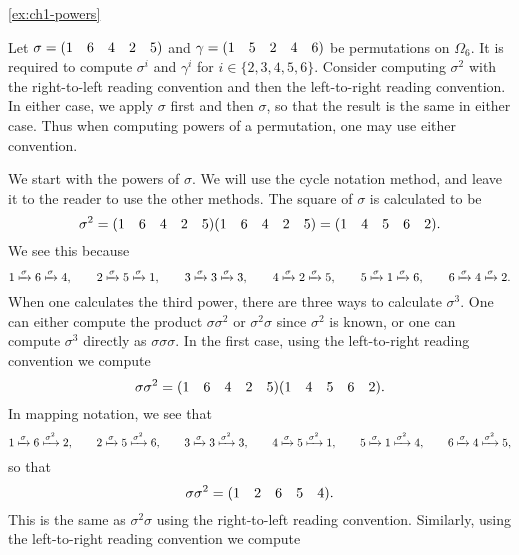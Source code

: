 \begin{solution}{\ref{ex:ch1-powers}}{
    Let \(\sigma = (1 \quad 6 \quad 4 \quad 2 \quad 5)\) and \(\gamma = (1 \quad 5 \quad 2 \quad 4 \quad 6)\) be permutations on \(\Omega_{6}\). It is required to compute \(\sigma^{i}\) and \(\gamma^{i}\) for \(i \in \{2, 3, 4, 5, 6\}\). Consider computing \(\sigma^{2}\) with the right-to-left reading convention and then the left-to-right reading convention. In either case, we apply \(\sigma\) first and then \(\sigma\), so that the result is the same in either case. Thus when computing powers of a permutation, one may use either convention.

    We start with the powers of \(\sigma\). We will use the cycle notation method, and leave it to the reader to use the other methods. The square of \(\sigma\) is calculated to be
    \[
    \sigma^{2} = (1 \quad 6 \quad 4 \quad 2 \quad 5)(1 \quad 6 \quad 4 \quad 2 \quad 5) = (1 \quad 4 \quad 5 \quad 6 \quad 2).
    \]
    We see this because
    \[
    1 \xmapsto{\sigma} 6 \xmapsto{\sigma} 4, \hspace{20pt} 2 \xmapsto{\sigma} 5 \xmapsto{\sigma} 1, \hspace{20pt} 3 \xmapsto{\sigma} 3 \xmapsto{\sigma} 3, \hspace{20pt} 4 \xmapsto{\sigma} 2 \xmapsto{\sigma} 5, \hspace{20pt} 5 \xmapsto{\sigma} 1 \xmapsto{\sigma} 6, \hspace{20pt} 6 \xmapsto{\sigma} 4 \xmapsto{\sigma} 2.
    \]
    When one calculates the third power, there are three ways to calculate \(\sigma^{3}\). One can either compute the product \(\sigma\sigma^{2}\) or \(\sigma^{2}\sigma\) since \(\sigma^{2}\) is known, or one can compute \(\sigma^{3}\) directly as \(\sigma\sigma\sigma\). In the first case, using the left-to-right reading convention we compute
    \[
    \sigma\sigma^{2} = (1 \quad 6 \quad 4 \quad 2 \quad 5)(1 \quad 4 \quad 5 \quad 6 \quad 2).
    \]
    In mapping notation, we see that
    \[
    1 \xmapsto{\sigma} 6 \xmapsto{\sigma^{2}} 2, \hspace{20pt} 2 \xmapsto{\sigma} 5 \xmapsto{\sigma^{2}} 6, \hspace{20pt} 3 \xmapsto{\sigma} 3 \xmapsto{\sigma^{2}} 3, \hspace{20pt} 4 \xmapsto{\sigma} 5 \xmapsto{\sigma^{2}} 1, \hspace{20pt} 5 \xmapsto{\sigma} 1 \xmapsto{\sigma^{2}} 4, \hspace{20pt} 6 \xmapsto{\sigma} 4 \xmapsto{\sigma^{2}} 5,
    \]
    so that
    \[
    \sigma\sigma^{2} = (1 \quad 2 \quad 6 \quad 5 \quad 4).
    \]
    This is the same as \(\sigma^{2}\sigma\) using the right-to-left reading convention. Similarly, using the left-to-right reading convention we compute
}
\end{solution}
